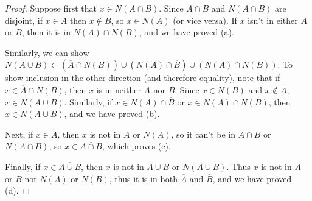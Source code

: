 \begin{proof}
	
	Suppose first that $x\in N(A\cap B)$.  Since $A\cap B$ and $N(A\cap B)$ are disjoint, if $x\in A$ then $x\notin B$, so $x\in N(A)$ (or vice versa).  If $x$ isn't in either $A$ or $B$, then it is in $N(A)\cap N(B)$, and we have proved (a).
	
	Similarly, we can show  $N(A\cup B) \subset (\overline{A}\cap N(B))\cup (N(A) \cap \overline{B}) \cup (N(A)\cap N(B))$.  To show inclusion in the other direction (and therefore equality), note that if $x\in \overline{A}\cap N(B)$, then $x$ is in neither $A$ nor $B$.  Since $x\in N(B)$ and $x\notin A$, $x\in N(A\cup B)$.  Similarly, if $x\in N(A)\cap\overline{B}$ or $x\in N(A)\cap N(B)$, then  $x\in N(A\cup B)$, and we have proved (b).
	
	Next, if $x\in \overline{A}$, then $x$ is not in $A$ or $N(A)$, so it can't be in $A\cap B$ or $N(A\cap B)$, so $x\in \overline{A\cap B}$, which proves (c).
	
	Finally, if $x\in \overline{A\cup B}$, then $x$ is not in $A\cup B$ or $N(A\cup B)$.  Thus $x$ is not in $A$ or $B$ nor $N(A)$ or $N(B)$, thus it is in both $\overline{A}$ and $\overline{B}$, and we have proved (d).
	
	
	
	
\end{proof}

